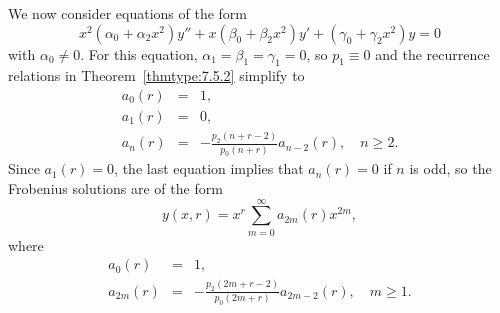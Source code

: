 \documentclass{ximera}
\begin{document}
We now consider equations of the form
\begin{equation} \label{eq:7.5.23}
x^2(\alpha_0+\alpha_2x^2)y''+x(\beta_0+\beta_2x^2)y'+
(\gamma_0+\gamma_2x^2)y=0
\end{equation}
with $\alpha_0\neq 0$. For this equation,
$\alpha_1=\beta_1=\gamma_1=0$, so $p_1\equiv0$ and the recurrence
relations in Theorem~\ref{thmtype:7.5.2} simplify to
\begin{eqnarray*}
a_0(r)&=&1,\\
a_1(r)&=&0,\\
a_n(r)&=&-\frac{p_2(n+r-2)}{p_0(n+r)}a_{n-2}(r),\quad n\geq2.
\end{eqnarray*}
Since $a_1(r)=0$, the last equation implies that $a_n(r)=0$ if $n$ is
odd, so the Frobenius solutions are of the form
$$
y(x,r)=x^r\sum_{m=0}^\infty a_{2m}(r)x^{2m},
$$
where
\begin{equation} \label{eq:7.5.24}
\begin{array}{ccl}
a_0(r)&=&1,\\
a_{2m}(r)&=&-\frac{p_2(2m+r-2)}{p_0(2m+r)}a_{2m-2}(r),\quad m\geq1.
\end{array}
\end{equation}
\end{document}
